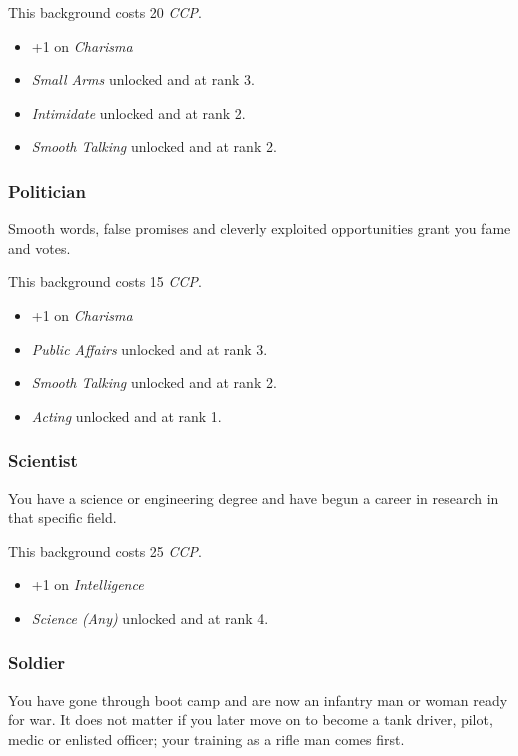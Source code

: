 This background costs 20 \emph{CCP}.

\begin{itemize}
\item +1 on \emph{Charisma}
\item \emph{Small Arms} unlocked and at rank 3.
\item \emph{Intimidate} unlocked and at rank 2.
\item \emph{Smooth Talking} unlocked and at rank 2.
\end{itemize}

\subsubsection{Politician}

Smooth words, false promises and cleverly exploited opportunities grant you fame
and votes.

This background costs 15 \emph{CCP}.

\begin{itemize}
\item +1 on \emph{Charisma}
\item \emph{Public Affairs} unlocked and at rank 3.
\item \emph{Smooth Talking} unlocked and at rank 2.
\item \emph{Acting} unlocked and at rank 1.
\end{itemize}

\subsubsection{Scientist}

You have a science or engineering degree and have begun a career in research in
that specific field.

This background costs 25 \emph{CCP}.

\begin{itemize}
\item +1 on \emph{Intelligence}
\item \emph{Science (Any)} unlocked and at rank 4.
\end{itemize}

\subsubsection{Soldier}

You have gone through boot camp and are now an infantry man or woman ready for
war. It does not matter if you later move on to become a tank driver, pilot,
medic or enlisted officer; your training as a rifle man comes first.

